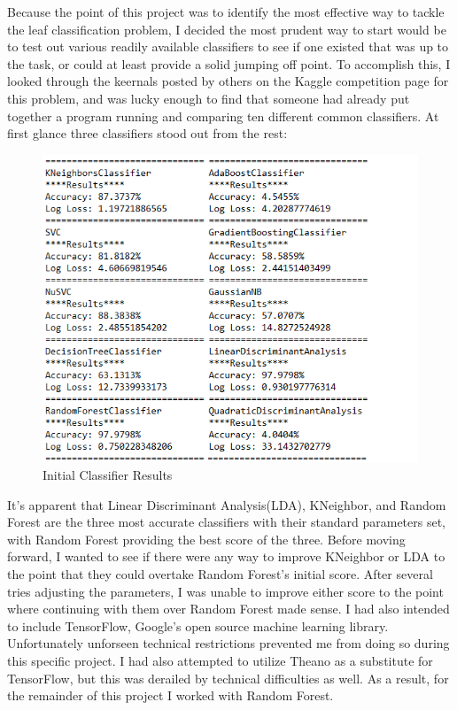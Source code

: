 \documentclass[12pt]{article}
\begin{document}
Because the point of this project was to identify the most effective way to tackle the leaf classification problem, I decided the most prudent way to start would be to test out various readily available classifiers to see if one existed that was up to the task, or could at least provide a solid jumping off point. To accomplish this, I looked through the keernals posted by others on the Kaggle competition page for this problem, and was lucky enough to find that someone had already put together a program running and comparing ten different common classifiers. At first glance three classifiers stood out from the rest:

\begin{figure}[H]
\includegraphics{ClassifierComparison.png}
\caption{Initial Classifier Results}
\end{figure}

It's apparent that Linear Discriminant Analysis(LDA), KNeighbor, and Random Forest are the three most accurate classifiers with their standard parameters set, with Random Forest providing the best score of the three. Before moving forward, I wanted to see if there were any way to improve KNeighbor or LDA to the point that they could overtake Random Forest's initial score. After several tries adjusting the parameters, I was unable to improve either score to the point where continuing with them over Random Forest made sense. I had also intended to include TensorFlow, Google's open source machine learning library. Unfortunately unforseen technical restrictions prevented me from doing so during this specific project. I had also attempted to utilize Theano as a substitute for TensorFlow, but this was derailed by technical difficulties as well. As a result, for the remainder of this project I worked with Random Forest.
\end{document}
